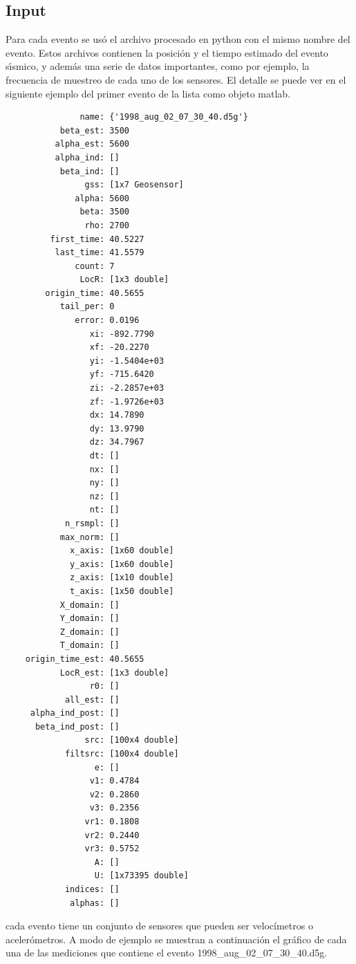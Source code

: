 \subsection{Input}

Para cada evento se usó el archivo procesado en python con el mismo nombre del
evento.
Estos archivos contienen la posición y el tiempo estimado del evento s\'{\i}smico, y
además una serie de datos importantes, como por ejemplo, la frecuencia de
muestreo de cada uno de los sensores. El detalle se puede ver en el siguiente
ejemplo del primer evento de la lista como objeto matlab.
\begin{verbatim}
               name: {'1998_aug_02_07_30_40.d5g'}
           beta_est: 3500
          alpha_est: 5600
          alpha_ind: []
           beta_ind: []
                gss: [1x7 Geosensor]
              alpha: 5600
               beta: 3500
                rho: 2700
         first_time: 40.5227
          last_time: 41.5579
              count: 7
               LocR: [1x3 double]
        origin_time: 40.5655
           tail_per: 0
              error: 0.0196
                 xi: -892.7790
                 xf: -20.2270
                 yi: -1.5404e+03
                 yf: -715.6420
                 zi: -2.2857e+03
                 zf: -1.9726e+03
                 dx: 14.7890
                 dy: 13.9790
                 dz: 34.7967
                 dt: []
                 nx: []
                 ny: []
                 nz: []
                 nt: []
            n_rsmpl: []
           max_norm: []
             x_axis: [1x60 double]
             y_axis: [1x60 double]
             z_axis: [1x10 double]
             t_axis: [1x50 double]
           X_domain: []
           Y_domain: []
           Z_domain: []
           T_domain: []
    origin_time_est: 40.5655
           LocR_est: [1x3 double]
                 r0: []
            all_est: []
     alpha_ind_post: []
      beta_ind_post: []
                src: [100x4 double]
            filtsrc: [100x4 double]
                  e: []
                 v1: 0.4784
                 v2: 0.2860
                 v3: 0.2356
                vr1: 0.1808
                vr2: 0.2440
                vr3: 0.5752
                  A: []
                  U: [1x73395 double]
            indices: []
             alphas: []
\end{verbatim}
cada evento tiene un conjunto de sensores que pueden ser velocímetros o
acelerómetros. A modo de ejemplo se muestran a continuación el gráfico de cada
una de las mediciones que contiene el evento 1998\_aug\_02\_07\_30\_40.d5g.
